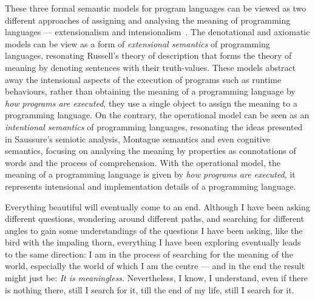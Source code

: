 \begin{highlightnew}
These three formal semantic models for program languages can be viewed as two different approaches of assigning and analysing the meaning of programming languages --- extensionalism and intensionalism~\citep{viva}. The denotational and axiomatic models can be view as a form of \emph{extensional semantics} of programming languages, resonating Russell's theory of description that forms the theory of meaning by denoting sentences with their truth-values. These models abstract away the intensional aspects of the execution of programs such as runtime behaviours, rather than obtaining the meaning of a programming language by \emph{how programs are executed}, they use a single object to assign the meaning to a programming language. On the contrary, the operational model can be seen as an \emph{intentional semantics} of programming languages, resonating the ideas presented in Saussure's semiotic analysis, Montague semantics and even cognitive semantics, focusing on analysing the meaning by properties as connotations of words and the process of comprehension. With the operational model, the meaning of a programming language is given by \emph{how programs are executed}, it represents intensional and implementation details of a programming language.
\end{highlightnew}



\begin{center}
\vspace{-0.7em}
\vspace{-0.3em}
\end{center}

Everything beautiful will eventually come to an end. Although I have been asking different questions, wondering around different paths, and searching for different angles to gain some understandings of the questions I have been asking, like the bird with the impaling thorn, everything I have been exploring eventually leads to the same direction: I am in the process of searching for the meaning of the world, especially the world of which I am the centre --- and in the end the result might just be: \emph{It is meaningless}. Nevertheless, I know, I understand, even if there is nothing there, still I search for it, till the end of my life, still I search for it.